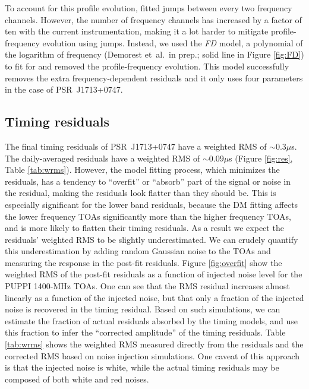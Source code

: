 To account for this profile evolution, \citet{sns+05} fitted jumps
between every two frequency channels. However, the number of frequency
channels has increased by a factor of ten with the current instrumentation, making it a lot harder to mitigate profile-frequency evolution using jumps. 
Instead, we used the {\it FD} model, a polynomial of the logarithm of
frequency (Demorest et~al.\ in prep.; solid line in Figure
\ref{fig:FD}) to fit for and removed the profile-frequency
evolution. This model successfully removes the extra
frequency-dependent residuals and it only uses four parameters in the
case of PSR~J1713+0747.



\subsection{Timing residuals}
\label{sec:res}

The final timing residuals of PSR~J1713+0747 have a weighted RMS of
$\sim 0.3\mu$s. The daily-averaged residuals have a weighted RMS of $\sim
0.09\mu$s (Figure \ref{fig:res}, Table \ref{tab:wrms}).
However, the model fitting process, which minimizes the residuals, has a tendency to ``overfit'' or 
``absorb'' part of the signal or noise in the residual, making the residuals
look flatter than they should be. 
This is especially significant for the lower band residuals, because
the DM fitting affects the lower frequency TOAs significantly more than the
higher frequency TOAs, and is more likely to flatten their timing residuals. 
As a result we expect the residuals' weighted RMS to be slightly underestimated. We can crudely quantify
this underestimation by adding random Gaussian noise to the TOAs and
measuring the response in the post-fit residuals. Figure \ref{fig:overfit} show
the weighted RMS of the post-fit residuals as a function of injected
noise level for the PUPPI 1400-MHz TOAs. 
One can see that the RMS residual increases almost linearly as a function of the
injected noise, but that only a fraction of the injected noise is
recovered in the timing residual.
Based on such simulations, we
can estimate the fraction of actual residuals absorbed by the timing models, and use this fraction to infer the ``corrected amplitude'' of the timing residuals. 
Table \ref{tab:wrms} shows the weighted RMS measured directly from the residuals 
and the corrected RMS based on noise injection simulations. One caveat 
of this approach is that the injected noise is white, while the actual timing
residuals may be composed of both white and red noises. 


